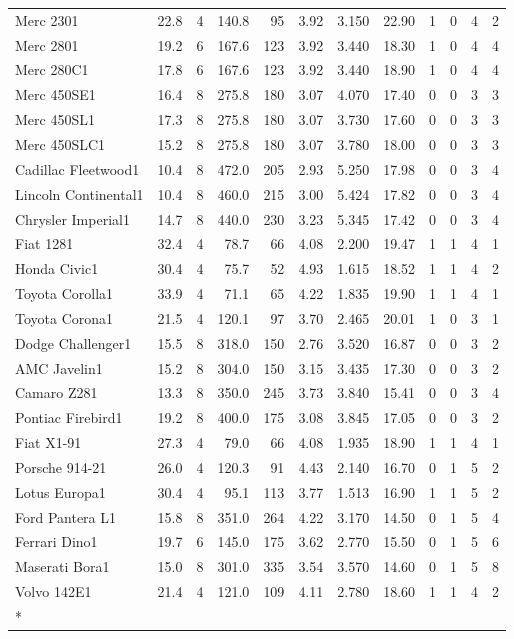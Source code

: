 \documentclass[a4paper, nobind]{templates/ociamthesis}
\begin{document}
\begin{longtable}{lrrrrrrrrrrr}
\addlinespace
Merc 2301 & 22.8 & 4 & 140.8 & 95 & 3.92 & 3.150 & 22.90 & 1 & 0 & 4 & 2\\
Merc 2801 & 19.2 & 6 & 167.6 & 123 & 3.92 & 3.440 & 18.30 & 1 & 0 & 4 & 4\\
Merc 280C1 & 17.8 & 6 & 167.6 & 123 & 3.92 & 3.440 & 18.90 & 1 & 0 & 4 & 4\\
Merc 450SE1 & 16.4 & 8 & 275.8 & 180 & 3.07 & 4.070 & 17.40 & 0 & 0 & 3 & 3\\
Merc 450SL1 & 17.3 & 8 & 275.8 & 180 & 3.07 & 3.730 & 17.60 & 0 & 0 & 3 & 3\\
\addlinespace
Merc 450SLC1 & 15.2 & 8 & 275.8 & 180 & 3.07 & 3.780 & 18.00 & 0 & 0 & 3 & 3\\
Cadillac Fleetwood1 & 10.4 & 8 & 472.0 & 205 & 2.93 & 5.250 & 17.98 & 0 & 0 & 3 & 4\\
Lincoln Continental1 & 10.4 & 8 & 460.0 & 215 & 3.00 & 5.424 & 17.82 & 0 & 0 & 3 & 4\\
Chrysler Imperial1 & 14.7 & 8 & 440.0 & 230 & 3.23 & 5.345 & 17.42 & 0 & 0 & 3 & 4\\
Fiat 1281 & 32.4 & 4 & 78.7 & 66 & 4.08 & 2.200 & 19.47 & 1 & 1 & 4 & 1\\
\addlinespace
Honda Civic1 & 30.4 & 4 & 75.7 & 52 & 4.93 & 1.615 & 18.52 & 1 & 1 & 4 & 2\\
Toyota Corolla1 & 33.9 & 4 & 71.1 & 65 & 4.22 & 1.835 & 19.90 & 1 & 1 & 4 & 1\\
Toyota Corona1 & 21.5 & 4 & 120.1 & 97 & 3.70 & 2.465 & 20.01 & 1 & 0 & 3 & 1\\
Dodge Challenger1 & 15.5 & 8 & 318.0 & 150 & 2.76 & 3.520 & 16.87 & 0 & 0 & 3 & 2\\
AMC Javelin1 & 15.2 & 8 & 304.0 & 150 & 3.15 & 3.435 & 17.30 & 0 & 0 & 3 & 2\\
\addlinespace
Camaro Z281 & 13.3 & 8 & 350.0 & 245 & 3.73 & 3.840 & 15.41 & 0 & 0 & 3 & 4\\
Pontiac Firebird1 & 19.2 & 8 & 400.0 & 175 & 3.08 & 3.845 & 17.05 & 0 & 0 & 3 & 2\\
Fiat X1-91 & 27.3 & 4 & 79.0 & 66 & 4.08 & 1.935 & 18.90 & 1 & 1 & 4 & 1\\
Porsche 914-21 & 26.0 & 4 & 120.3 & 91 & 4.43 & 2.140 & 16.70 & 0 & 1 & 5 & 2\\
Lotus Europa1 & 30.4 & 4 & 95.1 & 113 & 3.77 & 1.513 & 16.90 & 1 & 1 & 5 & 2\\
\addlinespace
Ford Pantera L1 & 15.8 & 8 & 351.0 & 264 & 4.22 & 3.170 & 14.50 & 0 & 1 & 5 & 4\\
Ferrari Dino1 & 19.7 & 6 & 145.0 & 175 & 3.62 & 2.770 & 15.50 & 0 & 1 & 5 & 6\\
Maserati Bora1 & 15.0 & 8 & 301.0 & 335 & 3.54 & 3.570 & 14.60 & 0 & 1 & 5 & 8\\
Volvo 142E1 & 21.4 & 4 & 121.0 & 109 & 4.11 & 2.780 & 18.60 & 1 & 1 & 4 & 2\\*
\end{longtable}
\endgroup{}
\end{document}
